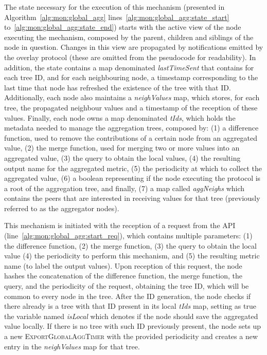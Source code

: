 

The state necessary for the execution of this mechanism (presented in Algorithm~\ref{alg:mon:global_agg} lines~\ref{alg:mon:global_agg:state_start} to~\ref{alg:mon:global_agg:state_end}) starts with the active view of the node executing the mechanism, composed by the parent, children and siblings of the node in question. Changes in this view are propagated by notifications emitted by the overlay protocol (these are omitted from the pseudocode for readability). In addition, the state contains a map denominated \textit{lastTimeSent} that contains for each tree ID, and for each neighbouring node, a timestamp corresponding to the last time that node has refreshed the existence of the tree with that ID. Additionally, each node also maintains a \textit{neighValues} map, which stores, for each tree, the propagated neighbour values and a timestamp of the reception of these values. Finally, each node owns a map denominated \textit{tIds},  which holds the metadata needed to manage the aggregation trees, composed by: (1) a difference function, used to remove the contributions of a certain node from an aggregated value, (2) the merge function, used for merging two or more values into an aggregated value, (3) the query to obtain the local values, (4) the resulting output name for the aggregated metric, (5) the periodicity at which to collect the aggregated value, (6) a boolean representing if the node executing the protocol is a root of the aggregation tree, and finally, (7) a map called \textit{aggNeighs} which contains the peers that are interested in receiving values for that tree (previously referred to as the aggregator nodes).

This mechanism is initiated with the reception of a request from the API (line~\ref{alg:mon:global_agg:start_req}), which contains multiple parameters: (1) the difference function, (2) the merge function, (3) the query to obtain the local value (4) the periodicity to perform this mechanism, and (5) the resulting metric name (to label the output values). Upon reception of this request, the node hashes the concatenation of the difference function, the merge function, the query, and the periodicity of the request, obtaining the tree ID, which will be common to every node in the tree. After the ID generation, the node checks if there already is a tree with that ID present in its local \textit{tIds} map, setting as true the variable named \textit{isLocal} which denotes if the node should save the aggregated value locally. If there is no tree with such ID previously present, the node sets up a new \textsc{ExportGlobalAggTimer} with the provided periodicity and creates a new entry in the \textit{neighValues} map for that tree.

